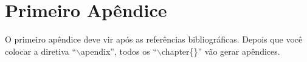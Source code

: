 \documentclass[dissertacao,brazil]{ThesisPUC}
\begin{document}





\arial


\normalfont

\appendix

\chapter{Primeiro Apêndice}
O primeiro apêndice deve vir após as referências bibliográficas. Depois que você colocar a diretiva ``{$\backslash$}apendix'', todos os ``{$\backslash$}chapter\{\}'' vão gerar apêndices.
\end{document}
